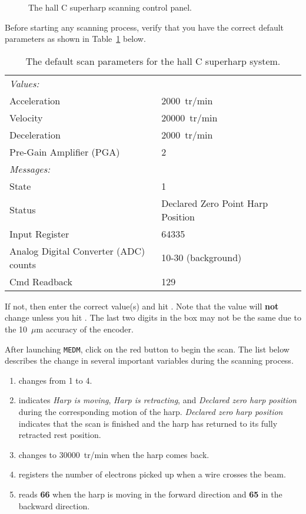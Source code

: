 \begin{figure}[!hbt]
\begin{center}
\caption{The hall C superharp scanning control panel.}\label{figure:scan_harp}
\end{center}
\end{figure}

Before starting any scanning process, verify that you have the correct default parameters as shown in
Table~\ref{table:scan_harp} below.
\begin{table}[!hbt]
\begin{center}
\begin{tabular}{llr}
\hline
\hline
{\it Values:}			&	\\ 
Acceleration			& 2000~tr/min	\\
Velocity			& 20000~tr/min	\\
Deceleration			& 2000~tr/min	\\
Pre-Gain Amplifier (PGA)	& 2	\\
\hline
\hline
{\it Messages:} 		&	\\
State				& 1	\\
Status				& Declared Zero Point Harp Position \\
Input Register			& 64335 \\
Analog Digital Converter (ADC) counts& 10-30 (background) \\
Cmd Readback			& 129	\\
\hline
\hline
\end{tabular}
	\caption{The default scan parameters for the hall C superharp system.}
	\label{table:scan_harp}
\end{center}
\end{table}
If not, then enter the correct value(s) and hit {\bf{}}. Note that the value will {\bf not}
change  unless you hit . The last two digits in the
{\bf{}} box may
not be the same due to the 10~$\mu$m accuracy of the encoder.

After launching {\tt MEDM}, click on the red {\bf{}} button to begin the scan. The list
below describes the  change in several important variables during the scanning process.
\begin{enumerate}
\item {} changes from 1 to 4.
\item {} indicates {\it Harp is moving}, {\it Harp is retracting}, and
	{\it Declared zero harp position} during the corresponding motion of the harp.
	{\it Declared zero harp position} indicates that the scan is finished and the harp has
	returned to its fully retracted rest position.
\item {} changes to 30000~tr/min when the harp comes back.
\item {} registers the number of electrons picked up when a wire crosses the beam.
\item {} reads {\bf 66} when the harp is moving in the forward direction
	and {\bf 65} in the backward direction.
\end{enumerate}


